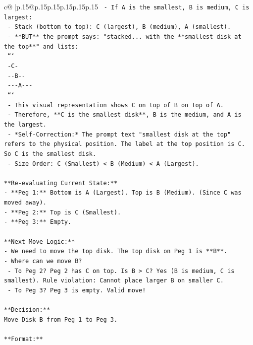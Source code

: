 \documentclass{article}
\begin{document}
{\begin{supertabular}{c@{$\;$}|p{.15\linewidth}@{}p{.15\linewidth}p{.15\linewidth}p{.15\linewidth}p{.15\linewidth}p{.15\linewidth}}
{{{\texttt{  {-} If A is the smallest, B is medium, C is largest:} \\
\texttt{    {-} Stack (bottom to top): C (largest), B (medium), A (smallest).} \\
\texttt{    {-} **BUT** the prompt says: "stacked... with the **smallest disk at the top**" and lists:} \\
\texttt{      ```} \\
\texttt{      {-}C{-}} \\
\texttt{      {-}{-}B{-}{-}} \\
\texttt{      {-}{-}{-}A{-}{-}{-}} \\
\texttt{      ```} \\
\texttt{    {-} This visual representation shows C on top of B on top of A.} \\
\texttt{    {-} Therefore, **C is the smallest disk**, B is the medium, and A is the largest.} \\
\texttt{    {-} *Self{-}Correction:* The prompt text "smallest disk at the top" refers to the physical position. The label at the top position is C. So C is the smallest disk.} \\
\texttt{    {-} Size Order: C (Smallest) < B (Medium) < A (Largest).} \\
\\ 
\texttt{**Re{-}evaluating Current State:**} \\
\texttt{{-} **Peg 1:** Bottom is A (Largest). Top is B (Medium). (Since C was moved away).} \\
\texttt{{-} **Peg 2:** Top is C (Smallest).} \\
\texttt{{-} **Peg 3:** Empty.} \\
\\ 
\texttt{**Next Move Logic:**} \\
\texttt{{-} We need to move the top disk. The top disk on Peg 1 is **B**.} \\
\texttt{{-} Where can we move B?} \\
\texttt{  {-} To Peg 2? Peg 2 has C on top. Is B > C? Yes (B is medium, C is smallest). Rule violation: Cannot place larger B on smaller C.} \\
\texttt{  {-} To Peg 3? Peg 3 is empty. Valid move!} \\
\\ 
\texttt{**Decision:**} \\
\texttt{Move Disk B from Peg 1 to Peg 3.} \\
\\ 
\texttt{**Format:**} \\
}}}
\end{supertabular}}
\end{document}
